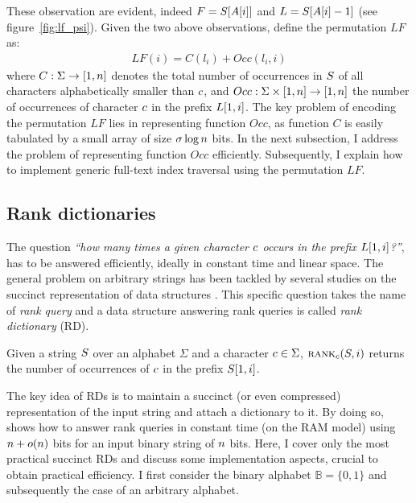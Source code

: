 These observation are evident, indeed $F = S[A[i]]$ and $L = S[A[i]-1]$ (see figure~\ref{fig:lf_psi}).
Given the two above observations, \cite{Ferragina2000} define the permutation $LF$ as:
\begin{eqnarray}
LF(i) = C(l_i) + Occ(l_i, i)
\end{eqnarray}
where $C : \Sigma \rightarrow [1,n]$ denotes the total number of occurrences in $S$ of all characters alphabetically smaller than $c$, and $Occ :  \Sigma \times [1,n] \rightarrow [1,n]$ the number of occurrences of character $c$ in the prefix $L[1,i]$.
The key problem of encoding the permutation $LF$ lies in representing function $Occ$, as function $C$ is easily tabulated by a small array of size $\sigma \log{n}$ bits.
In the next subsection, I address the problem of representing function $Occ$ efficiently. Subsequently, I explain how to implement generic full-text index traversal using the permutation $LF$.

\subsection{Rank dictionaries}
\label{sec:index:succinct:rd}

The question \emph{``how many times a given character $c$ occurs in the prefix $L[1,i]$?''}, has to be answered efficiently, ideally in constant time and linear space.
The general problem on arbitrary strings has been tackled by several studies on the succinct representation of data structures \citep{Jacobson1989}.
This specific question takes the name of \emph{rank query} and a data structure answering rank queries is called \emph{rank dictionary} (RD).

\begin{definition}
Given a string $S$ over an alphabet $\Sigma$ and a character $c \in \Sigma$, $\textsc{rank}_{c}(S, i)$ returns the number of occurrences of $c$ in the prefix $S[1,i]$.
\end{definition}

The key idea of RDs is to maintain a succinct (or even compressed) representation of the input string and attach a dictionary to it.
By doing so, \cite{Jacobson1989} shows how to answer rank queries in constant time (on the RAM model) using $n + o(n)$ bits for an input binary string of $n$ bits.
Here, I cover only the most practical succinct RDs and discuss some implementation aspects, crucial to obtain practical efficiency.
I first consider the binary alphabet $\mathbb{B} = \{ 0, 1 \}$ and subsequently the case of an arbitrary alphabet.

